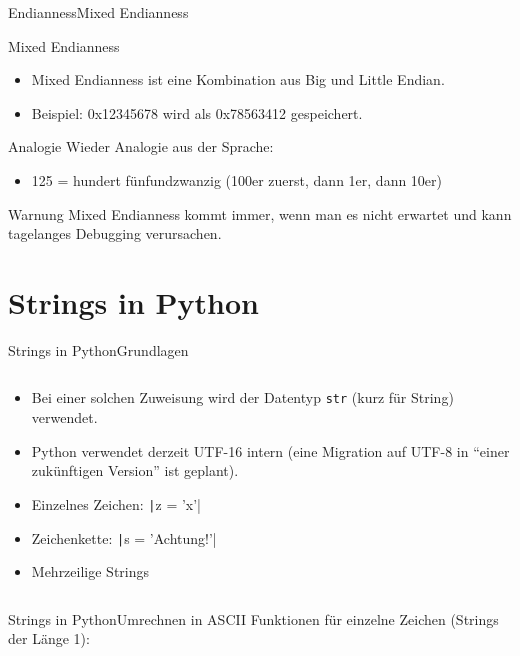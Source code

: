 \documentclass[xelatex,aspectratio=169]{beamer}
\begin{document}
\begin{frame}{Endianness}{Mixed Endianness}
    \begin{alertblock}{Mixed Endianness}
        \begin{itemize}
            \item Mixed Endianness ist eine Kombination aus Big und Little Endian.
            \item Beispiel: 0x12345678 wird als 0x78563412 gespeichert.
        \end{itemize}
    \end{alertblock}
    \begin{exampleblock}{Analogie}
        Wieder Analogie aus der Sprache:
        \begin{itemize}
            \item 125 = hundert fünfundzwanzig (100er zuerst, dann 1er, dann 10er)
        \end{itemize}
    \end{exampleblock}
    \begin{alertblock}{Warnung}
        Mixed Endianness kommt immer, wenn man es nicht erwartet und kann tagelanges Debugging verursachen.
    \end{alertblock}
\end{frame}

\section{Strings in Python}

\begin{frame}{Strings in Python}{Grundlagen}
    \inputminted{python}{src/strings_hello.py}
    \begin{itemize}
        \item Bei einer solchen Zuweisung wird der Datentyp \texttt{str} (kurz für String) verwendet.
        \item Python verwendet derzeit UTF-16 intern (eine Migration auf UTF-8 in \enquote{einer zukünftigen Version} ist geplant).
        \item Einzelnes Zeichen: \texttt|z = 'x'|
        \item Zeichenkette: \texttt|s = 'Achtung!'|
        \item Mehrzeilige Strings
              \inputminted{python}{src/strings_multiline.py}
    \end{itemize}
\end{frame}

\begin{frame}{Strings in Python}{Umrechnen in ASCII}
    Funktionen für einzelne Zeichen (Strings der Länge 1):
    \inputminted{python}{src/strings_conversion.py}

\end{frame}
\end{document}
